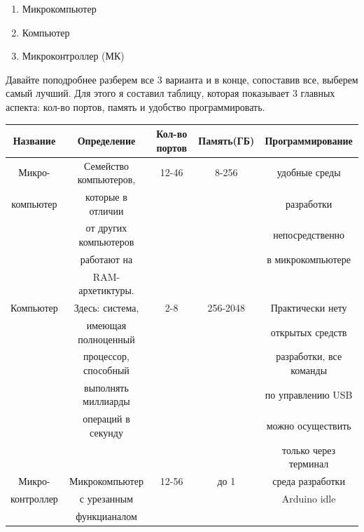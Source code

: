 \documentclass[a4paper, 12pt]{article}
\begin{document}
\begin{enumerate}
  \item   Микрокомпьютер
  \item   Компьютер
  \item   Микроконтроллер (МК)
\end{enumerate}

Давайте поподробнее разберем все 3 варианта и в конце, сопоставив все, выберем
самый лучший. Для этого я составил таблицу, которая показывает 3 главных
аспекта: кол-во портов, память и удобство программировать.
\begin{center}
  \begin{small}
    \begin{tabular}{ |c|c|c|c|c|}
      \hline
      Название   & Определение            & Кол-во портов & Память(ГБ) & Программирование        \\ \hline

      Микро-     & Семейство компьютеров, & 12-46         & 8-256      & удобные среды           \\
      компьютер  & которые в отличии      &               &            & разработки              \\
                 & от других компьютеров  &               &            & непосредственно         \\
                 & работают на            &               &            & в микрокомпьютере       \\
                 & RAM-архетиктуры.       &               &            &                         \\ \hline

      Компьютер  & Здесь: система,        & 2-8           & 256-2048   & Практически нету        \\
                 & имеющая полноценный    &               &            & открытых средств        \\
                 & процессор, способный   &               &            & разработки, все команды \\
                 & выполнять миллиарды    &               &            & по управлению USB       \\
                 & операций в секунду     &               &            & можно осуществить       \\
                 &                        &               &            & только через терминал   \\\hline

      Микро-     & Микрокомпьютер         & 12-56         & до 1       & среда разработки        \\
      контроллер & с урезанным            &               &            & Arduino idle            \\
                 & функцианалом           &               &            &                         \\
      \hline
    \end{tabular}
  \end{small}
\end{center}
\end{document}
